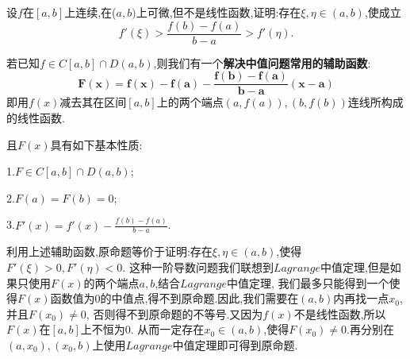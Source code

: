 \documentclass[lang=cn,newtx,10pt,scheme=chinese]{elegantbook}
\begin{document}
\begin{exercise}
    设$f$在$[a,b]$上连续,在($a,b)$上可微,但不是线性函数,证明:存在$\xi,\eta\in(a,b)$,使成立
    \begin{equation}
            f'(\xi)>\frac{f(b)-f(a)}{b-a}>f'(\eta).
        \nonumber
    \end{equation}
\end{exercise}
\begin{conclusion}
    若已知$f\in C\left[ a,b \right] \cap D\left( a,b \right)$,则我们有一个\hypertarget{中值问题常用辅助函数(利用线性函数构造)}{\textbf{解决中值问题常用的辅助函数}}:
    \begin{equation}
        \boldsymbol{F}\left( \boldsymbol{x} \right) =\boldsymbol{f}\left( \boldsymbol{x} \right) -\boldsymbol{f}\left( \boldsymbol{a} \right) -\frac{\boldsymbol{f}\left( \boldsymbol{b} \right) -\boldsymbol{f}\left( \boldsymbol{a} \right)}{\boldsymbol{b}-\boldsymbol{a}}\left( \boldsymbol{x}-\boldsymbol{a} \right) 
        \nonumber
    \end{equation}
    即用$f(x)$减去其在区间$[a,b]$上的两个端点$(a,f(a)),(b,f(b))$连线所构成的线性函数.
    
    且$F(x)$具有如下基本性质:
    
    1.$F\in C\left[ a,b \right] \cap D\left( a,b \right)$;

    2.$F(a)=F(b)=0$;

    3.$F'(x)=f'(x)-\frac{f\left( b \right) -f\left( a \right)}{b-a}$.
\end{conclusion}
\begin{note}
    利用上述辅助函数,原命题等价于证明:存在$\xi,\eta\in(a,b)$,使得$F'(\xi)>0,F'(\eta)<0$.
    这种一阶导数问题我们联想到$Lagrange$中值定理,但是如果只使用$F(x)$的两个端点$a,b$,结合$Lagrange$中值定理,
    我们最多只能得到一个使得$F(x)$函数值为0的中值点,得不到原命题.因此,我们需要在$(a,b)$内再找一点$x_0$,并且$F(x_0)\ne0$,
    否则得不到原命题的不等号.又因为$f(x)$不是线性函数,所以$F(x)$在$[a,b]$上不恒为0.
    从而一定存在$x_0\in(a,b)$,使得$F(x_0)\ne0$.再分别在$(a,x_0),(x_0,b)$上使用$Lagrange$中值定理即可得到原命题.
\end{note}
\end{document}
